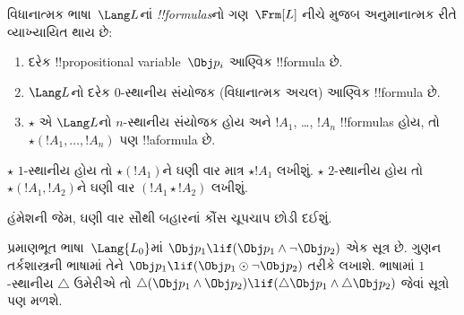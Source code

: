 \documentclass[../../../include/open-logic-section]{subfiles}
\begin{document}


\begin{defn}[સૂત્ર]
વિધાનાત્મક ભાષા~$\Lang L$નાં \emph{!!{formula}s}નો
ગણ~$\Frm[L]$ નીચે મુજબ અનુમાનાત્મક રીતે વ્યાખ્યાયિત થાય છે:
\begin{enumerate}
\item દરેક !!{propositional variable}~$\Obj p_i$ આણ્વિક
  !!{formula} છે.
\item $\Lang L$નો દરેક $0$-સ્થાનીય સંયોજક
  (વિધાનાત્મક અચલ) આણ્વિક !!{formula} છે.
\item $\star$ એ $\Lang L$નો $n$-સ્થાનીય સંયોજક
  હોય અને $!A_1$, \dots, $!A_n$ !!{formula}s હોય,
  તો $\star(!A_1, \dots, !A_n)$ પણ !!a{formula} છે.
\end{enumerate}
$\star$ $1$-સ્થાનીય હોય તો $\star(!A_1)$ને ઘણી વાર
માત્ર $\star !A_1$ લખીશું. $\star$ $2$-સ્થાનીય હોય તો
$\star(!A_1,!A_2)$ને ઘણી વાર $(!A_1 \star !A_2)$
લખીશું.
\end{defn}

હંમેશની જેમ, ઘણી વાર સૌથી બહારનાં કૌંસ ચૂપચાપ
છોડી દઈશું.

\begin{ex}
  પ્રમાણભૂત ભાષા~$\Lang{L_0}$માં $\Obj p_1 \lif (\Obj p_1
  \land \lnot \Obj p_2)$ એક સૂત્ર છે. ગુણન
  તર્કશાસ્ત્રની ભાષામાં તેને $\Obj p_1 \lif (\Obj p_1 \odot
  \lnot \Obj p_2)$ તરીકે લખાશે. ભાષામાં $1$-સ્થાનીય
  $\triangle$ ઉમેરીએ તો $\triangle (\Obj p_1
  \land \Obj p_2) \lif (\triangle \Obj p_1 \land \triangle \Obj p_2)$
  જેવાં સૂત્રો પણ મળશે.
\end{ex}
\end{document}
